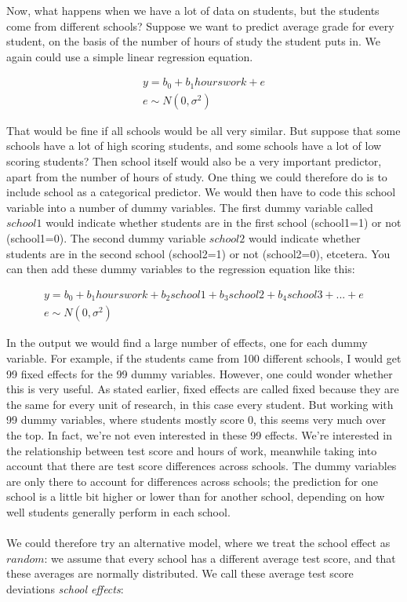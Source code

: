 \documentclass[]{book}\usepackage[]{graphicx}\usepackage[]{color}
\begin{document}
Now, what happens when we have a lot of data on students, but the students come from different schools? Suppose we want to predict average grade for every student, on the basis of the number of hours of study the student puts in. We again could use a simple linear regression equation. 

\begin{eqnarray}
y = b_0 + b_1 hourswork + e \\
e \sim N(0, \sigma^2)
\end{eqnarray}



That would be fine if all schools would be all very similar. But suppose that some schools have a lot of high scoring students, and some schools have a lot of low scoring students? Then school itself would also be a very important predictor, apart from the number of hours of study. One thing we could therefore do is to include school as a categorical predictor. We would then have to code this school variable into a number of dummy variables. The first dummy variable called $school1$ would indicate whether students are in the first school (school1=1) or not (school1=0). The second dummy variable $school2$ would indicate whether students are in the second school (school2=1) or not (school2=0), etcetera. You can then add these dummy variables to the regression equation like this:

\begin{eqnarray}
y = b_0 + b_1 hourswork + b_2 school1 + b_3 school2 + b_4 school3 + ... + e  \nonumber\\
e \sim N(0, \sigma^2)  \nonumber
\end{eqnarray}

In the output we would find a large number of effects, one for each dummy variable. For example, if the students came from 100 different schools, I would get 99 fixed effects for the 99 dummy variables. However, one could wonder whether this is very useful. As stated earlier, fixed effects are called fixed because they are the same for every unit of research, in this case every student. But working with 99 dummy variables, where students mostly score 0, this seems very much over the top. In fact, we're not even interested in these 99 effects. We're interested in the relationship between test score and hours of work, meanwhile taking into account that there are test score differences across schools. The dummy variables are only there to account for differences across schools; the prediction for one school is a little bit higher or lower than for another school, depending on how well students generally perform in each school. 
\\
\\
We could therefore try an alternative model, where we treat the school effect as $random$: we assume that every school has a different average test score, and that these averages are normally distributed. We call these average test score deviations \textit{school effects}:
\end{document}
